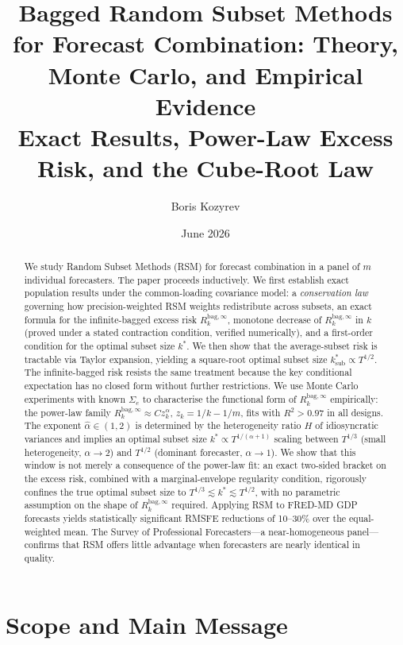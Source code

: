 \documentclass[12pt,a4paper]{article}
\title{\textbf{Bagged Random Subset Methods for Forecast Combination:
       Theory, Monte Carlo, and Empirical Evidence}\\[0.5em]
       \large Exact Results, Power-Law Excess Risk, and the Cube-Root Law}
\author{Boris Kozyrev}
\date{June 2026}
\theoremstyle{definition}
\newcommand{\Rk}{R_k^{\mathrm{bag},\infty}}
\begin{document}
\maketitle

\begin{abstract}
We study Random Subset Methods (RSM) for forecast combination in a panel of
$m$ individual forecasters.  The paper proceeds inductively.  We first
establish exact population results under the common-loading covariance
model: a \emph{conservation law} governing how precision-weighted RSM
weights redistribute across subsets, an exact formula for the
infinite-bagged excess risk $\Rk$, monotone decrease of $\Rk$ in $k$
(proved under a stated contraction condition, verified numerically),
and a first-order condition for the optimal subset size $k^*$.
We then show that the average-subset risk is tractable via Taylor expansion,
yielding a square-root optimal subset size $k^*_{\mathrm{sub}}\propto T^{1/2}$.
The infinite-bagged risk resists the same treatment because the key
conditional expectation has no closed form without further restrictions.
We use Monte Carlo experiments with known $\Sigma_e$ to characterise the
functional form of $\Rk$ empirically: the power-law family
$\Rk\approx Cz_k^\alpha$, $z_k=1/k-1/m$, fits with $R^2>0.97$ in all
designs.  The exponent $\hat\alpha\in(1,2)$ is determined by the
heterogeneity ratio $H$ of idiosyncratic variances and implies an optimal
subset size $k^*\propto T^{1/(\alpha+1)}$ scaling between $T^{1/3}$
(small heterogeneity, $\alpha\to 2$) and $T^{1/2}$ (dominant forecaster,
$\alpha\to 1$).  We show that this window is not merely a consequence of
the power-law fit: an exact two-sided bracket on the excess risk, combined
with a marginal-envelope regularity condition, rigorously confines the true
optimal subset size to $T^{1/3}\lesssim k^*\lesssim T^{1/2}$, with no
parametric assumption on the shape of $\Rk$ required.  Applying RSM to
FRED-MD GDP forecasts yields statistically significant RMSFE reductions of
10--30\% over the equal-weighted mean.  The Survey of Professional
Forecasters---a near-homogeneous panel---confirms that RSM offers little
advantage when forecasters are nearly identical in quality.
\end{abstract}

\tableofcontents
\newpage

\section{Scope and Main Message}
\label{sec:scope}
\end{document}
